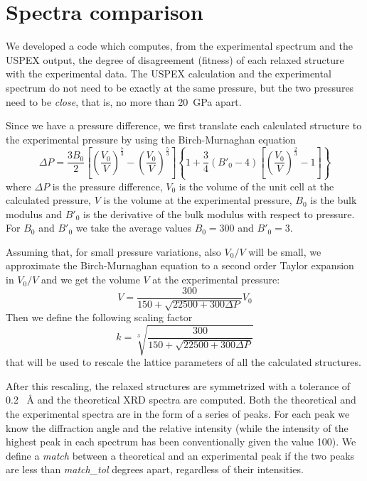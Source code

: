 \documentclass{article}
\begin{document}
\appendix
\appendixpage

\section{Spectra comparison}
\label{sec:spectracomp}

We developed a code which computes, from the experimental spectrum and the USPEX output, the degree of disagreement (fitness) of each relaxed structure with the experimental data. The USPEX calculation and the experimental spectrum do not need to be exactly at the same pressure, but the two pressures need to be \emph{close}, that is, no more than \SI{20}{GPa} apart.

Since we have a pressure difference, we first translate each calculated structure to the experimental pressure by using the Birch-Murnaghan equation
\begin{equation*}
	\Delta P = \frac{3 B_0}{2} \left[ \left( \frac{V_0}{V} \right)^{\frac{7}{3}} - \left( \frac{V_0}{V} \right)^{\frac{5}{3}} \right] \left\{ 1 + \frac{3}{4} \left( B'_0 - 4 \right) \left[ \left( \frac{V_0}{V} \right)^{\frac{2}{3}} - 1 \right] \right\}
\end{equation*}
where $\Delta P$ is the pressure difference, $V_0$ is the volume of the unit cell at the calculated pressure, $V$ is the volume at the experimental pressure, $B_0$ is the bulk modulus and $B'_0$ is the derivative of the bulk modulus with respect to pressure. For $B_0$ and $B'_0$ we take the average values $B_0 = 300$ and $B'_0 = 3$. 

Assuming that, for small pressure variations, also $V_0/V$ will be small, we approximate the Birch-Murnaghan equation to a second order Taylor expansion in $V_0/V$ and we get the volume $V$ at the experimental pressure:
\begin{equation*}
	V = \frac{300}{150 + \sqrt{22500 + 300 \Delta P}} V_0
\end{equation*}
Then we define the following scaling factor
\begin{equation*}
	k = \sqrt[3]{\frac{300}{150 + \sqrt{22500 + 300 \Delta P}}}
\end{equation*}
that will be used to rescale the lattice parameters of all the calculated structures.

After this rescaling, the relaxed structures are symmetrized with a tolerance of 0.2 \SI{}{\angstrom} and the theoretical XRD spectra are computed. Both the theoretical and the experimental spectra are in the form of a series of peaks. For each peak we know the diffraction angle and the relative intensity (while the intensity of the highest peak in each spectrum has been conventionally given the value 100). We define a \emph{match} between a theoretical and an experimental peak if the two peaks are less than \emph{match\_tol} degrees apart, regardless of their intensities.
\end{document}
